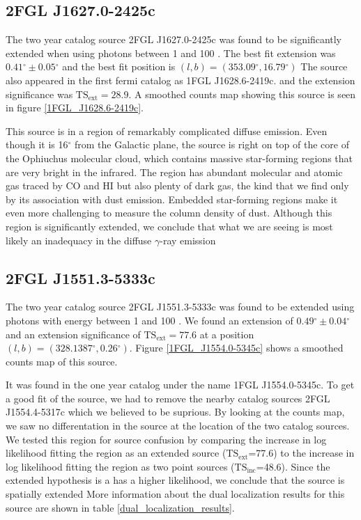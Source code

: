 \documentclass[12pt,preprint]{aastex}
\newcommand{\gev}{\text{GeV}\xspace}
\newcommand{\tsext}{{\ensuremath{\text{TS}_\text{ext}}}\xspace}
\newcommand{\tsinc}{\ensuremath{\text{TS}_\text{inc}}\xspace}
\renewcommand{\deg}{\ensuremath{^\circ}\xspace}
\begin{document}
\subsection{2FGL J1627.0-2425c}


The two year catalog source 2FGL J1627.0-2425c was found to be significantly
extended when using photons between 1 \gev and 100 \gev.  The best
fit extension was $0.41\deg\pm0.05\deg$ and the best fit position is
$(l,b)=(353.09\deg, 16.79\deg)$ The source also appeared in the first
fermi catalog as 1FGL J1628.6-2419c.  and the extension significance
was $\tsext=28.9$.  A smoothed counts map showing this source is seen
in figure \ref{1FGL_J1628.6-2419c}.

This source is in a region of remarkably complicated diffuse emission.
Even though it is 16\deg from the Galactic plane,
the source is right on top of the core of the Ophiuchus molecular cloud,
which contains massive star-forming regions that are very bright
in the infrared.  The region has abundant molecular and atomic gas
traced by CO and HI but also plenty of dark gas, the kind that
we find only by its association with dust emission.
Embedded star-forming regions make it even more challenging to measure
the column density of dust.
Although this region is significantly extended, we conclude that what we
are seeing is most likely an inadequacy in the diffuse $\gamma$-ray emission


\subsection{2FGL J1551.3-5333c}


The two year catalog source 2FGL J1551.3-5333c was found to be
extended using photons with energy between 1 \gev and 100 \gev.
We found an extension of $0.49\deg\pm 0.04\deg$ and an extension significance of
$\tsext=77.6$ at a position $(l,b)=(328.1387\deg,0.26\deg)$.  Figure
\ref{1FGL_J1554.0-5345c} shows a smoothed counts map of this source.

It was found in the one year catalog under the name 1FGL J1554.0-5345c.
To get a good fit of the source, we had to remove the nearby catalog
sources 2FGL J1554.4-5317c which we believed to be suprious. By looking at
the counts map, we saw no differentation in the source at the location
of the two catalog sources. We tested this region for source confusion
by comparing the increase in log likelihood fitting the region as an
extended source (\tsext=77.6) to the increase in log likelihood fitting
the region as two point sources (\tsinc=48.6).  Since the extended
hypothesis is a has a higher likelihood, we conclude that the source is
spatially extended More
information about the dual localization results for this source are
shown in table \ref{dual_localization_results}.
\end{document}
